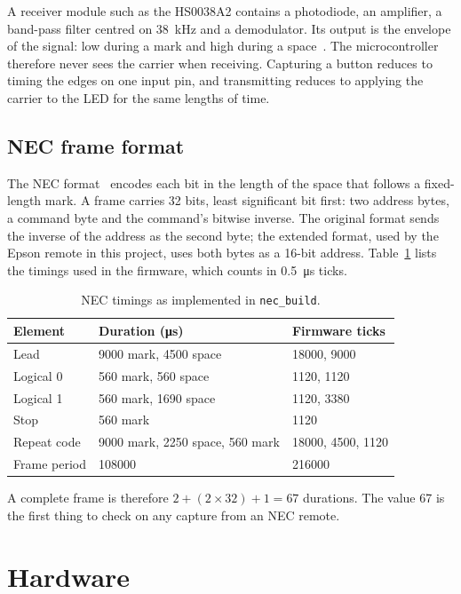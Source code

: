 \documentclass[11pt,a4paper]{article}
\newcommand{\code}[1]{\texttt{#1}}
\begin{document}
A receiver module such as the HS0038A2 contains a photodiode, an amplifier, a band-pass filter centred on \qty{38}{\kilo\hertz} and a demodulator. Its output is the envelope of the signal: low during a mark and high during a space~\cite{hs0038}. The microcontroller therefore never sees the carrier when receiving. Capturing a button reduces to timing the edges on one input pin, and transmitting reduces to applying the carrier to the LED for the same lengths of time.

\subsection{NEC frame format}

The NEC format~\cite{necproto} encodes each bit in the length of the space that follows a fixed-length mark. A frame carries 32 bits, least significant bit first: two address bytes, a command byte and the command's bitwise inverse. The original format sends the inverse of the address as the second byte; the extended format, used by the Epson remote in this project, uses both bytes as a 16-bit address. Table~\ref{tab:nec} lists the timings used in the firmware, which counts in \qty{0.5}{\micro\second} ticks.

\begin{table}[H]
\centering
\caption{NEC timings as implemented in \code{nec\_build}.}
\label{tab:nec}
\begin{tabular}{lll}
\toprule
Element & Duration (\unit{\micro\second}) & Firmware ticks\\
\midrule
Lead & \num{9000} mark, \num{4500} space & \num{18000}, \num{9000}\\
Logical 0 & 560 mark, 560 space & \num{1120}, \num{1120}\\
Logical 1 & 560 mark, \num{1690} space & \num{1120}, \num{3380}\\
Stop & 560 mark & \num{1120}\\
Repeat code & \num{9000} mark, \num{2250} space, 560 mark & \num{18000}, \num{4500}, \num{1120}\\
Frame period & \num{108000} & \num{216000}\\
\bottomrule
\end{tabular}
\end{table}

A complete frame is therefore $2 + (2 \times 32) + 1 = 67$ durations. The value 67 is the first thing to check on any capture from an NEC remote.

\section{Hardware}
\end{document}
